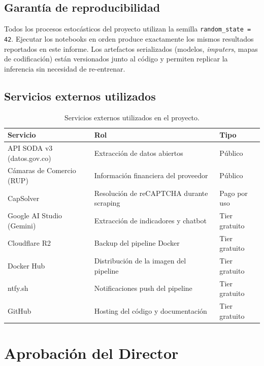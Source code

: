 \documentclass[12pt,letterpaper,oneside]{report}
\begin{document}
\section{Garantía de reproducibilidad}

Todos los procesos estocásticos del proyecto utilizan la semilla
\texttt{random\_state = 42}. Ejecutar los notebooks en orden produce
exactamente los mismos resultados reportados en este informe. Los
artefactos serializados (modelos, \emph{imputers}, mapas de codificación)
están versionados junto al código y permiten replicar la inferencia sin
necesidad de re-entrenar.

\section{Servicios externos utilizados}

\begin{table}[h!]
\centering
\caption{Servicios externos utilizados en el proyecto.}
\label{tab:servicios}
\begin{tabular}{lll}
\toprule
\textbf{Servicio} & \textbf{Rol} & \textbf{Tipo} \\
\midrule
API SODA v3 (datos.gov.co) & Extracción de datos abiertos & Público \\
Cámaras de Comercio (RUP) & Información financiera del proveedor & Público \\
CapSolver & Resolución de reCAPTCHA durante scraping & Pago por uso \\
Google AI Studio (Gemini) & Extracción de indicadores y chatbot & Tier gratuito \\
Cloudflare R2 & Backup del pipeline Docker & Tier gratuito \\
Docker Hub & Distribución de la imagen del pipeline & Tier gratuito \\
ntfy.sh & Notificaciones push del pipeline & Tier gratuito \\
GitHub & Hosting del código y documentación & Tier gratuito \\
\bottomrule
\end{tabular}
\end{table}

\chapter*{Aprobación del Director}
\end{document}
